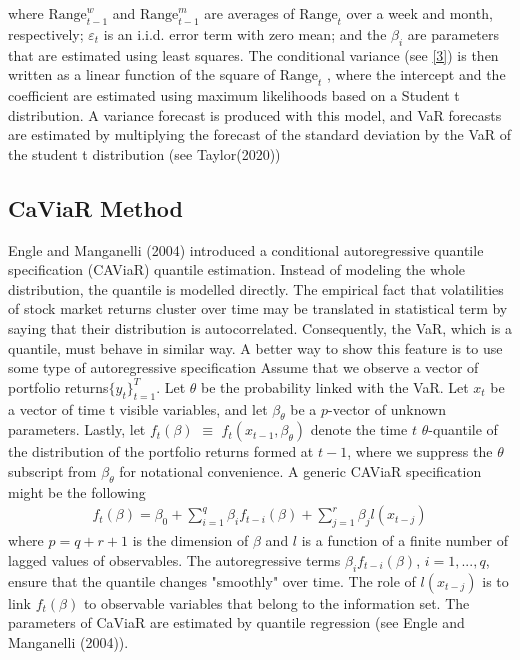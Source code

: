 \documentclass[a4paper,11pt,oneside]{book}
\begin{document}
where  $\text{Range}^{w}_{t-1}$
and $\text{Range}^{m}_{t-1}$ are
averages of $\text{Range}_{t}$ over a week and month, respectively;
$\varepsilon_t$
is an i.i.d. error term with zero mean; and the $\beta_{i}$
are parameters that are estimated using least squares.
The conditional variance (see \autoref{3})  is then written as a linear
function of the square of $\text{Range}_{t}$
, where the intercept and
the coefficient are estimated using maximum likelihoods
based on a Student t distribution. A variance forecast is produced with this model, and VaR forecasts are estimated by multiplying the forecast of the standard deviation by the VaR of the student t distribution (see Taylor(2020))


\subsection{CaViaR Method}
Engle and Manganelli (2004) introduced a conditional autoregressive quantile specification (CAViaR) quantile estimation. Instead of modeling the whole distribution, the quantile is modelled directly. The empirical fact that volatilities of stock market returns cluster over time may be translated in statistical term by saying that their distribution is autocorrelated. Consequently, the VaR, which is a quantile, must behave in similar way. A better way to show this feature is to use some type of autoregressive specification
\newline\newline
 Assume that we observe a vector of portfolio returns$\{y_t\}^T_{t=1}$. Let $\theta$ be the probability linked with the VaR. Let $x_t$ be a vector of time t visible variables, and let  ${\beta}_\theta$ be a $p$-vector of unknown parameters. Lastly, let $f_t(\beta) $ $\equiv$ $ f_t(x_{t-1},{\beta}_\theta)$ denote the time $t$ $\theta$-quantile of the distribution of the portfolio returns formed at $t-1$, where we suppress the $\theta$ subscript from $\beta_\theta$ for notational convenience. A generic CAViaR specification might be the following  
\begin{equation}
\begin{aligned}
f_t(\beta)=\beta_0 + \sum_{i=1}^{q} \beta_{i}f _{t-i}(\beta) +\sum_{j=1}^{r}\beta_{j}l(x_{t-j})
\label{5}
\end{aligned}
\end{equation}
where $p=q+r+1$ is the dimension of $\beta$ and $l$ is a function of a finite number of lagged values of observables. The autoregressive terms $\beta_{i}f_{t-i}(\beta)$, $i = 1,...,q$, ensure that the quantile changes "smoothly" over time. The role of $l(x_{t-j})$ is to link $f_{t}(\beta)$ to observable variables that belong to the information set. The parameters of CaViaR are estimated by quantile regression (see Engle and Manganelli (2004)).
\end{document}
